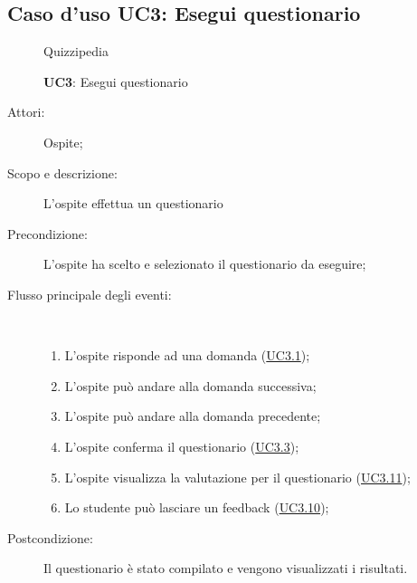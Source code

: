 \subsection{Caso d'uso UC3: Esegui questionario}
\begin{figure}[H]
	\centering
	\begin{resizedtikzpicture}{\textwidth}
		\begin{umlsystem}[x=0, fill=lightgray!20]{Quizzipedia}
		\end{umlsystem}
	\end{resizedtikzpicture}
	\caption{\textbf{UC3}: Esegui questionario}
	\label{UC3}
\end{figure}
\begin{description}
	\item[Attori:] Ospite;
	\item[Scopo e descrizione:] L'ospite effettua un questionario
	\item[Precondizione:] L'ospite ha scelto e selezionato il questionario da eseguire;
	
	\item[Flusso principale degli eventi:] \ 
	\begin{enumerate}
		\item L'ospite risponde ad una domanda (\hyperlink{UC3.1}{UC3.1});
		\item L'ospite può andare alla domanda successiva;
		\item L'ospite può andare alla domanda precedente;
		\item L'ospite conferma il questionario (\hyperlink{UC3.3}{UC3.3});
		\item L'ospite visualizza la valutazione per il questionario (\hyperlink{UC3.11}{UC3.11});
		\item Lo studente può lasciare un feedback (\hyperlink{UC3.10}{UC3.10});
		
	\end{enumerate}
	\item[Postcondizione:] Il questionario è stato compilato e vengono visualizzati i risultati.
\end{description}
\hypertarget{UC3.1}{}
